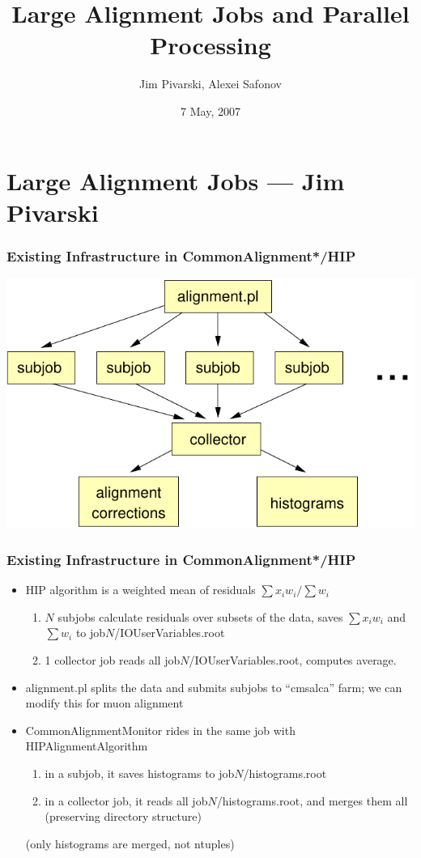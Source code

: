 \documentclass[compress]{beamer}
\title{Large Alignment Jobs and Parallel Processing}
\author{Jim Pivarski, Alexei Safonov}
\institute{Texas A\&M University}
\date{ 7 May, 2007}
\begin{document}
\frame{\titlepage}
\section*{Large Alignment Jobs --- Jim Pivarski}

\begin{frame}
\frametitle{Existing Infrastructure in CommonAlignment*/HIP}
\begin{center}
\includegraphics[width=0.8\linewidth]{flow}
\end{center}
\end{frame}

\begin{frame}
\frametitle{Existing Infrastructure in CommonAlignment*/HIP}
\begin{itemize}\setlength{\itemsep}{0.5 cm}
\item HIP algorithm is a weighted mean of residuals $\sum x_i w_i / \sum w_i$
\begin{enumerate}
\item $N$ subjobs calculate residuals over subsets of the data, saves
$\sum x_i w_i$ and $\sum w_i$ to job$N$/IOUserVariables.root
\item 1 collector job reads all job$N$/IOUserVariables.root, computes average.
\end{enumerate}
\item alignment.pl splits the data and submits subjobs to ``cmsalca''
farm; we can modify this for muon alignment
\item CommonAlignmentMonitor rides in the same job with HIPAlignmentAlgorithm
\begin{enumerate}
\item in a subjob, it saves histograms to job$N$/histograms.root
\item in a collector job, it reads all job$N$/histograms.root, and
merges them all (preserving directory structure)
\end{enumerate}
{\small (only histograms are merged, not ntuples)}
\end{itemize}
\end{frame}
\end{document}
